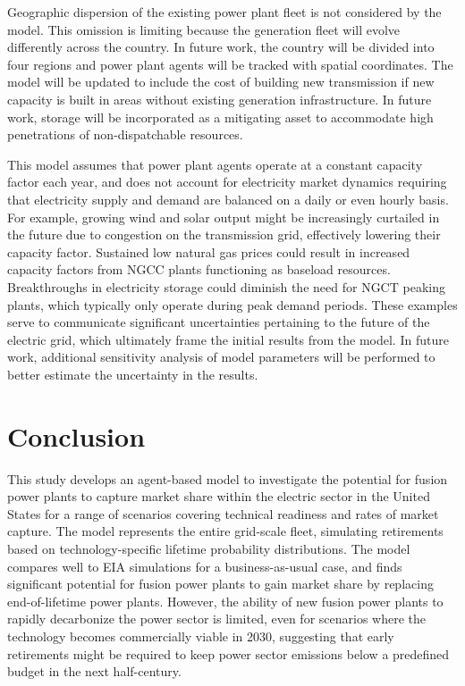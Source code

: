 \documentclass[preprint, 12pt]{elsarticle}
\begin{document}
Geographic dispersion of the existing power plant fleet is not considered by the model. This omission is limiting because the generation fleet will evolve differently across the country. In future work, the country will be divided into four regions and power plant agents will be tracked with spatial coordinates. The model will be updated to include the cost of building new transmission if new capacity is built in areas without existing generation infrastructure. In future work, storage will be incorporated as a mitigating asset to accommodate high penetrations of non-dispatchable resources.

This model assumes that power plant agents operate at a constant capacity factor each year, and does not account for electricity market dynamics requiring that electricity supply and demand are balanced on a daily or even hourly basis. For example, growing wind and solar output might be increasingly curtailed in the future due to congestion on the transmission grid, effectively lowering their capacity factor. Sustained low natural gas prices could result in increased capacity factors from NGCC plants functioning as baseload resources. Breakthroughs in electricity storage could diminish the need for NGCT peaking plants, which typically only operate during peak demand periods. These examples serve to communicate significant uncertainties pertaining to the future of the electric grid, which ultimately frame the initial results from the model. In future work, additional sensitivity analysis of model parameters will be performed to better estimate the uncertainty in the results.

\section{Conclusion}

This study develops an agent-based model to investigate the potential for fusion power plants to capture market share within the electric sector in the United States for a range of scenarios covering technical readiness and rates of market capture. The model represents the entire grid-scale fleet, simulating retirements based on technology-specific lifetime probability distributions. The model compares well to EIA simulations for a business-as-usual case, and finds significant potential for fusion power plants to gain market share by replacing end-of-lifetime power plants. However, the ability of new fusion power plants to rapidly decarbonize the power sector is limited, even for scenarios where the technology becomes commercially viable in 2030, suggesting that early retirements might be required to keep power sector emissions below a predefined budget in the next half-century.
\end{document}
